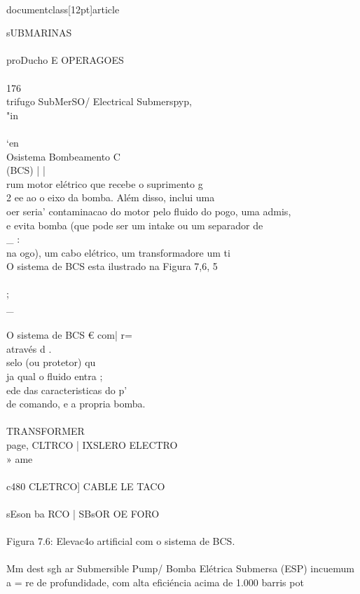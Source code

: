 \\documentclass[12pt]{article}
\begin{document}
sUBMARINAS\\
\\
proDucho E OPERAGOES\\
\\
176\\
trifugo SubMerSO/ Electrical Submerspyp,\\
"in\\
\\
‘en\\
Osistema Bombeamento C\\
(BCS) | |\\
rum motor elétrico que recebe o suprimento g\\
2 ee ao o eixo da bomba. Além disso, inclui uma\\
oer seria’ contaminacao do motor pelo fluido do pogo, uma admis,\\
e evita bomba (que pode ser um intake ou um separador de \\_ :\\
na ogo), um cabo elétrico, um transformadore um ti\\
O sistema de BCS esta ilustrado na Figura 7,6, 5\\
\\
; \\_\\
\\
O sistema de BCS € com| r=\\
através d .\\
selo (ou protetor) qu\\
ja qual o fluido entra ;\\
ede das caracteristicas do p'\\
de comando, e a propria bomba.\\
\\
TRANSFORMER\\
page, CLTRCO | IXSLERO ELECTRO\\
» ame\\
\\
c480 CLETRCO] CABLE LE TACO\\
\\
sEson ba RCO | SBsOR OE FORO\\
\\
Figura 7.6: Elevac4o artificial com o sistema de BCS.\\
\\
Mm dest sgh ar Submersible Pump/ Bomba Elétrica Submersa (ESP) incuemum\\
a = re de profundidade, com alta eficiéncia acima de 1.000 barris pot\\
\end{document}
